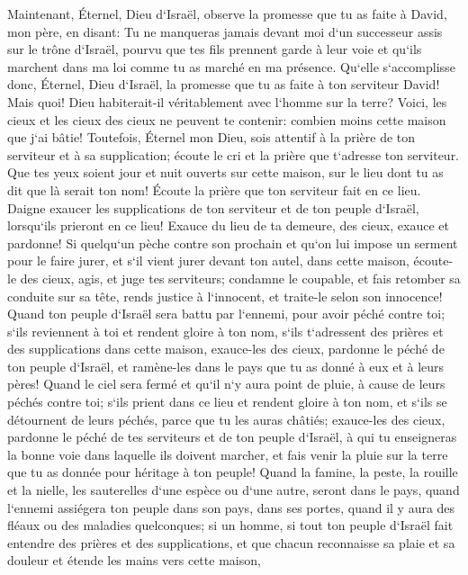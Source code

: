 \verse Maintenant, Éternel, Dieu d`Israël, observe la promesse que tu as faite à David, mon père, en disant: Tu ne manqueras jamais devant moi d`un successeur assis sur le trône d`Israël, pourvu que tes fils prennent garde à leur voie et qu`ils marchent dans ma loi comme tu as marché en ma présence. 
\verse Qu`elle s`accomplisse donc, Éternel, Dieu d`Israël, la promesse que tu as faite à ton serviteur David! 
\verse Mais quoi! Dieu habiterait-il véritablement avec l`homme sur la terre? Voici, les cieux et les cieux des cieux ne peuvent te contenir: combien moins cette maison que j`ai bâtie! 
\verse Toutefois, Éternel mon Dieu, sois attentif à la prière de ton serviteur et à sa supplication; écoute le cri et la prière que t`adresse ton serviteur. 
\verse Que tes yeux soient jour et nuit ouverts sur cette maison, sur le lieu dont tu as dit que là serait ton nom! Écoute la prière que ton serviteur fait en ce lieu. 
\verse Daigne exaucer les supplications de ton serviteur et de ton peuple d`Israël, lorsqu`ils prieront en ce lieu! Exauce du lieu de ta demeure, des cieux, exauce et pardonne! 
\verse Si quelqu`un pèche contre son prochain et qu`on lui impose un serment pour le faire jurer, et s`il vient jurer devant ton autel, dans cette maison, 
\verse écoute-le des cieux, agis, et juge tes serviteurs; condamne le coupable, et fais retomber sa conduite sur sa tête, rends justice à l`innocent, et traite-le selon son innocence! 
\verse Quand ton peuple d`Israël sera battu par l`ennemi, pour avoir péché contre toi; s`ils reviennent à toi et rendent gloire à ton nom, s`ils t`adressent des prières et des supplications dans cette maison, 
\verse exauce-les des cieux, pardonne le péché de ton peuple d`Israël, et ramène-les dans le pays que tu as donné à eux et à leurs pères! 
\verse Quand le ciel sera fermé et qu`il n`y aura point de pluie, à cause de leurs péchés contre toi; s`ils prient dans ce lieu et rendent gloire à ton nom, et s`ils se détournent de leurs péchés, parce que tu les auras châtiés; 
\verse exauce-les des cieux, pardonne le péché de tes serviteurs et de ton peuple d`Israël, à qui tu enseigneras la bonne voie dans laquelle ils doivent marcher, et fais venir la pluie sur la terre que tu as donnée pour héritage à ton peuple! 
\verse Quand la famine, la peste, la rouille et la nielle, les sauterelles d`une espèce ou d`une autre, seront dans le pays, quand l`ennemi assiégera ton peuple dans son pays, dans ses portes, quand il y aura des fléaux ou des maladies quelconques; 
\verse si un homme, si tout ton peuple d`Israël fait entendre des prières et des supplications, et que chacun reconnaisse sa plaie et sa douleur et étende les mains vers cette maison, 
